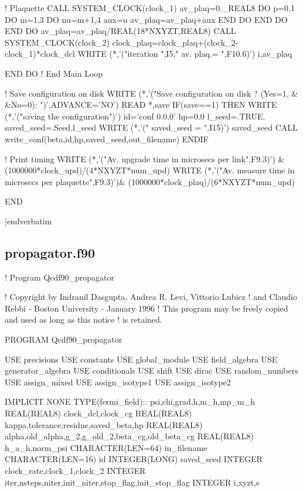{! Plaquette
      CALL SYSTEM_CLOCK(clock_1)
      av_plaq=0._REAL8
      DO p=0,1
      DO m=1,3
        DO nu=m+1,4
          aux=u%
          av_plaq=av_plaq+aux
        END DO
      END DO
      END DO
      av_plaq=av_plaq/REAL(18*NXYZT,REAL8)
      CALL SYSTEM_CLOCK(clock_2)
      clock_plaq=clock_plaq+(clock_2-clock_1)*clock_dcl
     WRITE (*,'("iteration ",I5," av. plaq.= ",F10.6)') i,av_plaq

   END DO                                ! End Main Loop

! Save configuration on disk
   WRITE (*,'("Save configuration on disk ? (Yes=1, &
               &No=0): ")',ADVANCE='NO')
   READ *,save
   IF(save==1) THEN
     WRITE (*,'("saving the configuration")')
     id='conf 0.0.0'
     hp=0.0
     l_seed=.TRUE.
     saved_seed=.Seed.l_seed
     WRITE (*,'("  saved_seed = ",I15)') saved_seed
     CALL write_conf(beta,id,hp,saved_seed,out_filename)
   ENDIF


! Print timing
   WRITE (*,'("Av. upgrade time in microsecs per link",F9.3)') &
            (1000000*clock_upd)/(4*NXYZT*num_upd)
   WRITE (*,'("Av. measure time in microsecs per plaquette",F9.3)')&
            (1000000*clock_plaq)/(6*NXYZT*num_upd)

   END


|endverbatim


\subsection{propagator.f90}
\verbatim

!  Program Qcdf90_propagator

!  Copyright by Indranil Dasgupta, Andrea R. Levi, Vittorio Lubicz
!  and Claudio Rebbi  -  Boston University  -  January 1996
!  This program may be freely copied and used as long as this notice
!  is retained.

PROGRAM Qcdf90_propagator

   USE precisions
   USE constants
   USE global_module
   USE field_algebra
   USE generator_algebra
   USE conditionals
   USE shift
   USE dirac
   USE random_numbers
   USE assign_mixed
   USE assign_isotype1
   USE assign_isotype2

   IMPLICIT NONE
   TYPE(fermi_field):: psi,chi,grad,h,m_h,mp_m_h
   REAL(REAL8) clock_dcl,clock_cg
   REAL(REAL8) kappa,tolerance,residue,saved_beta,hp
   REAL(REAL8) alpha,old_alpha,g_2,g_old_2,beta_cg,old_beta_cg
   REAL(REAL8) h_a_h,norm_psi
   CHARACTER(LEN=64) in_filename
   CHARACTER(LEN=16) id
   INTEGER(LONG) saved_seed
   INTEGER clock_rate,clock_1,clock_2
   INTEGER iter,nsteps,niter,init_niter,stop_flag,init_stop_flag
   INTEGER i,xyzt,s

}
